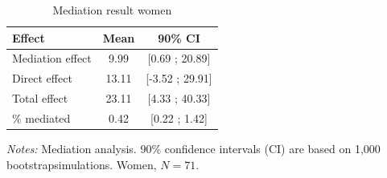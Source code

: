 \begin{table}[htbp]
\centering
\caption{Mediation result women}
\label{tab:mediation_attractiveness_women}
\begin{threeparttable}
\begin{tabular}{@{}lcc@{}}
\toprule
Effect & Mean & 90\% CI \\
\midrule
Mediation effect & 9.99 & [0.69 ; 20.89] \\
Direct effect & 13.11 & [-3.52 ; 29.91] \\
Total effect & 23.11 & [4.33 ; 40.33] \\
\% mediated & 0.42 & [0.22 ; 1.42] \\
\bottomrule
\end{tabular}
\begin{tablenotes}[flushleft]
\footnotesize
\item[] \textit{Notes:} Mediation analysis. 90\% confidence intervals (CI) are based on 1,000 bootstrapsimulations. Women, \(N=71\).
\end{tablenotes}
\end{threeparttable}
\end{table}
